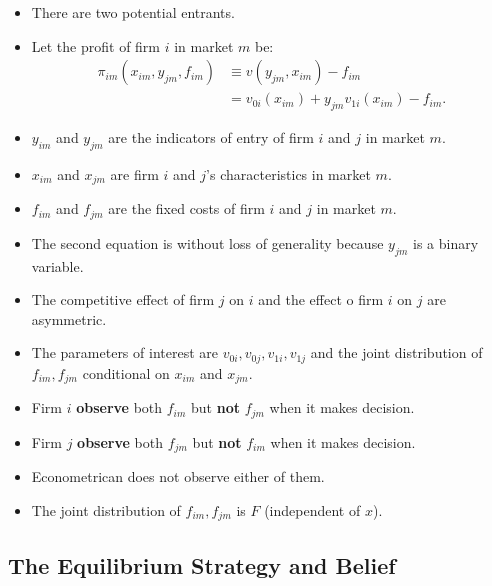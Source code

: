 \documentclass[
]{book}
\providecommand{\tightlist}{%
  \setlength{\itemsep}{0pt}\setlength{\parskip}{0pt}}
\begin{document}
\begin{itemize}
\tightlist
\item
  There are two potential entrants.
\item
  Let the profit of firm \(i\) in market \(m\) be:
  \[
  \begin{split}
  \pi_{im}(x_{im}, y_{jm}, f_{im}) & \equiv v(y_{jm}, x_{im}) - f_{im}\\
  &=v_{0i}(x_{im}) + y_{jm} v_{1i}(x_{im}) - f_{im}.
  \end{split}
  \]
\item
  \(y_{im}\) and \(y_{jm}\) are the indicators of entry of firm \(i\) and \(j\) in market \(m\).
\item
  \(x_{im}\) and \(x_{jm}\) are firm \(i\) and \(j\)'s characteristics in market \(m\).
\item
  \(f_{im}\) and \(f_{jm}\) are the fixed costs of firm \(i\) and \(j\) in market \(m\).
\item
  The second equation is without loss of generality because \(y_{jm}\) is a binary variable.
\item
  The competitive effect of firm \(j\) on \(i\) and the effect o firm \(i\) on \(j\) are asymmetric.
\item
  The parameters of interest are \(v_{0i}, v_{0j}, v_{1i}, v_{1j}\) and the joint distribution of \(f_{im}, f_{jm}\) conditional on \(x_{im}\) and \(x_{jm}\).
\item
  Firm \(i\) \textbf{observe} both \(f_{im}\) but \textbf{not} \(f_{jm}\) when it makes decision.
\item
  Firm \(j\) \textbf{observe} both \(f_{jm}\) but \textbf{not} \(f_{im}\) when it makes decision.
\item
  Econometrican does not observe either of them.
\item
  The joint distribution of \(f_{im}, f_{jm}\) is \(F\) (independent of \(x\)).
\end{itemize}

\hypertarget{the-equilibrium-strategy-and-belief}{%
\subsection{The Equilibrium Strategy and Belief}\label{the-equilibrium-strategy-and-belief}}
\end{document}
